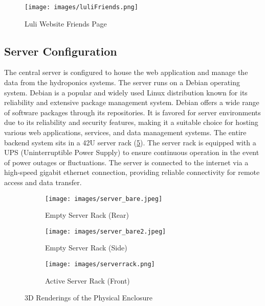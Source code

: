 \documentclass[12pt]{article} %
\begin{document}
  \begin{figure}[H]
    \centering
    \texttt{[image: images/luliFriends.png]}
    \caption{Luli Website Friends Page}
    \label{fig: friends page}
  \end{figure}

\subsection{Server Configuration}
\noindent The central server is configured to house the web application and manage the data 
from the hydroponics systems. The server runs on a Debian operating system. Debian is a popular and widely used Linux distribution known for its reliability and extensive package management system. Debian offers a wide range of software packages through its repositories. It is favored for server environments due to its reliability and security features, making it a suitable choice for hosting various web applications, services, and data management systems. The entire backend system sits in a 42U server rack (\ref{fig:serverrack}). The server rack is equipped with a UPS (Uninterruptible Power Supply) to ensure continuous operation in the event of power outages or fluctuations. The server is connected to the internet via a high-speed gigabit ethernet connection, providing reliable connectivity for remote access and data transfer.
\begin{figure}[H]
    \centering
    \begin{subfigure}[b]{0.25\textwidth}
        \centering
        \texttt{[image: images/server\_bare.jpeg]}
        \caption{Empty Server Rack (Rear)}
        \label{fig:emptyrackrear}
    \end{subfigure}
    \hfill
    \begin{subfigure}[b]{0.25\textwidth}
        \centering
        \texttt{[image: images/server\_bare2.jpeg]}
        \caption{Empty Server Rack (Side)}
        \label{fig:emptyrackside}
    \end{subfigure}
    \hfill
    \begin{subfigure}[b]{0.25\textwidth}
        \centering
        \texttt{[image: images/serverrack.png]}
        \caption{Active Server Rack (Front)}
        \label{fig:activerack}
    \end{subfigure}
    \caption{3D Renderings of the Physical Enclosure}
    \label{fig:serverrack}
\end{figure}
\end{document}
